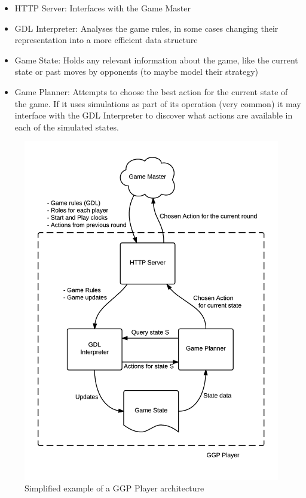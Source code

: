 \begin{itemize}
\item HTTP Server: Interfaces with the Game Master

\item \gls{GDL} Interpreter: Analyses the game rules, in some cases changing their representation into a more efficient data structure 

\item Game State: Holds any relevant information about the game, like the current state or past moves by opponents (to maybe model their strategy)

\item Game Planner: Attempts to choose the best action for the current state of the game. If it uses simulations as part of its operation (very common) it may interface with the \gls{GDL} Interpreter to discover what actions are available in each of the simulated states.
\end{itemize}

\begin{figure}[h]
	\centering
    \includegraphics[scale=0.8]{images/GGPplayer.png}
    \caption{Simplified example of a GGP Player architecture}
    \label{fig:player architecture}
\end{figure}

